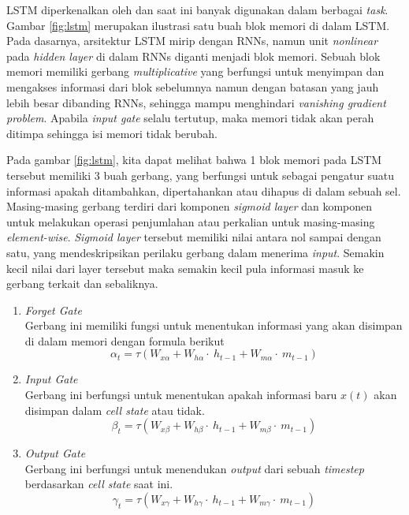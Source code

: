 LSTM diperkenalkan oleh \cite{hochreiter1997long} dan saat ini banyak digunakan dalam berbagai \textit{task}. Gambar \ref{fig:lstm} merupakan ilustrasi satu buah blok memori di dalam LSTM. Pada dasarnya, arsitektur LSTM mirip dengan RNNs, namun unit \textit{nonlinear} pada \textit{hidden layer} di dalam RNNs diganti menjadi blok memori. Sebuah blok memori memiliki gerbang \textit{multiplicative} yang berfungsi untuk menyimpan dan mengakses informasi dari blok sebelumnya namun dengan batasan yang jauh lebih besar dibanding RNNs, sehingga mampu menghindari \textit{vanishing gradient problem}. Apabila \textit{input gate} selalu tertutup, maka memori tidak akan perah ditimpa sehingga isi memori tidak berubah.

Pada gambar \ref{fig:lstm}, kita dapat melihat bahwa 1 blok memori pada LSTM tersebut memiliki 3 buah gerbang, yang berfungsi untuk sebagai pengatur suatu informasi apakah ditambahkan, dipertahankan atau dihapus di dalam sebuah sel. Masing-masing gerbang terdiri dari komponen \textit{sigmoid layer} dan komponen untuk melakukan operasi penjumlahan atau perkalian untuk masing-masing \textit{element-wise}. \textit{Sigmoid layer} tersebut memiliki nilai antara nol sampai dengan satu, yang mendeskripsikan perilaku gerbang dalam menerima \textit{input}. Semakin kecil nilai dari layer tersebut maka semakin kecil pula informasi masuk ke gerbang terkait dan sebaliknya. 

\begin{enumerate}
	\item \textit{Forget Gate}\\
	Gerbang ini memiliki fungsi untuk menentukan informasi yang akan disimpan di dalam memori dengan formula berikut
	\begin{equation}\label{eq:forget_lstm}
	\alpha_{t}=\tau(W_{x\alpha}+W_{h\alpha}\cdot~h_{t-1}+W_{m\alpha}\cdot~m_{t-1})
	\end{equation}
	
	\item \textit{Input Gate}\\
	Gerbang ini berfungsi untuk menentukan apakah informasi baru $ x(t) $ akan disimpan dalam \textit{cell state} atau tidak. 
	\begin{equation}\label{eq:input_lstm}
	\beta_{t}=\tau(W_{x\beta}+W_{h\beta}\cdot~h_{t-1}+W_{m\beta}\cdot~m_{t-1})
	\end{equation}
	
	\item \textit{Output Gate}\\
	Gerbang ini berfungsi untuk menendukan \textit{output} dari sebuah \textit{timestep} berdasarkan \textit{cell state} saat ini.
	\begin{equation}\label{eq:output_lstm}
	\gamma_{t}=\tau(W_{x\gamma}+W_{h\gamma}\cdot~h_{t-1}+W_{m\gamma}\cdot~m_{t-1})
	\end{equation}
	
\end{enumerate}

